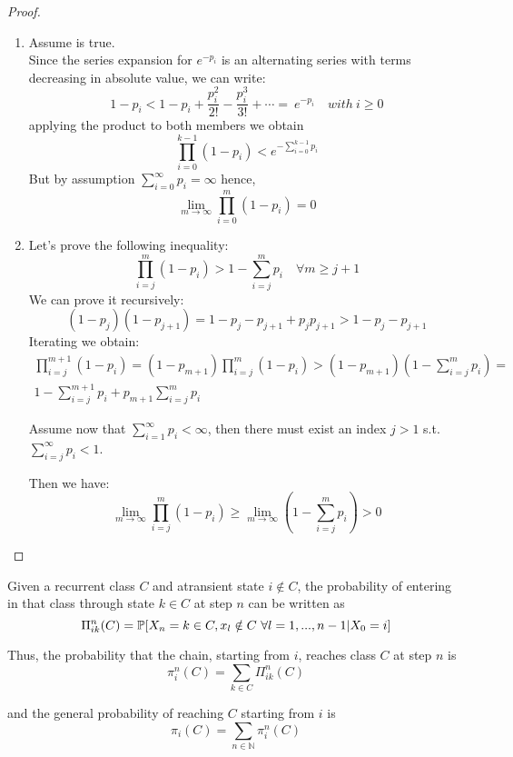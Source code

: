 	\begin{proof}
		\begin{enumerate}
			\item Assume  is true. \\
				Since the series expansion for $e^{-p_i}$ is an alternating series with terms decreasing in absolute value, we can write:
				\begin{equation}
					1-p_i < 1-p_i + \frac{p_i^2}{2!} - \frac{p_i^3}{3!} + \cdots = ~e^{-p_i} \quad with ~i\ge 0
				\end{equation}
				applying the product to both members we obtain
				\begin{equation}
					\prod_{i=0}^{k-1} (1-p_i) < e^{-\sum\limits_{i=0}^{k-1}p_i}
				\end{equation}
				But by assumption $\sum\limits_{i=0}^\infty p_i = \infty$ hence,
				$$ \lim_{m \to \infty} \prod_{i=0}^{m}(1-p_i) = 0 $$

			\item Let's prove the following inequality:
			$$ \prod_{i=j}^m(1-p_i) > 1-\sum\limits_{i=j}^m p_i \quad \forall m \ge j+1$$
			We can prove it recursively:
			$$(1-p_j)(1-p_{j+1}) = 1-p_j - p_{j+1} + p_j p_{j+1} > 1-p_j - p_{j+1}$$
			Iterating we obtain:
			\begin{eqnarray*}
				\prod_{i=j}^{m+1}(1-p_i) = (1-p_{m+1})\prod_{i=j}^m(1-p_i) > (1-p_{m+1})(1-\sum\limits_{i=j}^m p_i) = \\
				1- \sum\limits_{i=j}^{m+1} p_i + p_{m+1}\sum\limits_{i=j}^m p_i
			\end{eqnarray*}

			Assume now that $\sum\limits_{i=1}^\infty p_i < \infty$, then there must exist an index $j>1$ s.t. $\sum\limits_{i=j}^\infty p_i < 1$.

			Then we have:
			$$ \lim_{m \to \infty} \prod_{i=j}^m (1-p_i) \ge \lim_{m \to \infty} (1-\sum\limits_{i=j}^m p_i) > 0 $$
		\end{enumerate}
	\end{proof}

	\begin{definition}[lesson 22/03/17] \label{def:falling_probability}

		Given a recurrent class $C$ and atransient state $i \notin C$, the probability of entering in that class through state $k \in C$ at step $n$ can be written as
		$$ \Pi_{ik}^{n}(C) = \mathbb{P}[X_n = k \in C, x_l \notin C ~ \forall l=1, ..., n-1 | X_0 = i] $$

		Thus, the probability that the chain, starting from $i$, reaches class $C$ at step $n$ is
		$$ \pi_{i}^{n}(C) = \sum_{k \in C} \Pi_{ik}^{n}(C) $$

		and the general probability of reaching $C$ starting from $i$ is
		$$ \pi_i(C) = \sum_{n \in \mathbb{N}} \pi_i^{n}(C) $$
	\end{definition}

